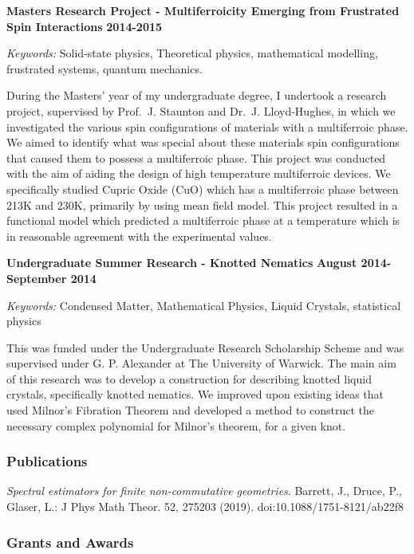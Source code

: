 \documentclass[a4paper,12pt]{article}
\begin{document}
\textbf{Masters Research Project - Multiferroicity Emerging from
Frustrated Spin Interactions} {\textbf{2014-2015}}

\emph{Keywords:} Solid-state physics, Theoretical physics, mathematical
modelling, frustrated systems, quantum mechanics.

During the Masters' year of my undergraduate degree, I undertook a
research project, supervised by Prof.~J. Staunton and Dr.~J.
Lloyd-Hughes, in which we investigated the various spin configurations
of materials with a multiferroic phase. We aimed to identify what was
special about these materials spin configurations that caused them to
possess a multiferroic phase. This project was conducted with the aim of
aiding the design of high temperature multiferroic devices. We
specifically studied Cupric Oxide (CuO) which has a multiferroic phase
between 213K and 230K, primarily by using mean field model. This project
resulted in a functional model which predicted a multiferroic phase at a
temperature which is in reasonable agreement with the experimental
values.

\textbf{Undergraduate Summer Research - Knotted Nematics}
{\textbf{August 2014-September 2014}}

\emph{Keywords:} Condensed Matter, Mathematical Physics, Liquid
Crystals, statistical physics

This was funded under the Undergraduate Research Scholarship Scheme and
was supervised under G. P. Alexander at The University of Warwick. The
main aim of this research was to develop a construction for describing
knotted liquid crystals, specifically knotted nematics. We improved upon
existing ideas that used Milnor's Fibration Theorem and developed a
method to construct the necessary complex polynomial for Milnor's
theorem, for a given knot.

\hypertarget{publications}{%
\subsubsection{Publications}\label{publications}}

\emph{Spectral estimators for finite non-commutative geometries}.
Barrett, J., Druce, P., Glaser, L.: J Phys Math Theor. 52, 275203
(2019). doi:10.1088/1751-8121/ab22f8

\hypertarget{grants-and-awards}{%
\subsubsection{Grants and Awards}\label{grants-and-awards}}
\end{document}
